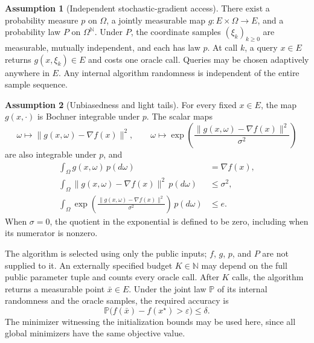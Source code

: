 \documentclass[10pt]{article}
\theoremstyle{definition}
\newtheorem{assumption}{Assumption}
\begin{document}
\begin{assumption}[Independent stochastic-gradient access]
There exist a probability measure $p$ on $\Omega$, a jointly measurable map $g:E\times\Omega\to E$, and a probability law $P$ on $\Omega^{\mathbb{N}}$. Under $P$, the coordinate samples $(\xi_k)_{k\geq0}$ are measurable, mutually independent, and each has law $p$. At call $k$, a query $x\in E$ returns $g(x,\xi_k)\in E$ and costs one oracle call. Queries may be chosen adaptively anywhere in $E$. Any internal algorithm randomness is independent of the entire sample sequence.
\end{assumption}

\begin{assumption}[Unbiasedness and light tails]
For every fixed $x\in E$, the map $g(x,\cdot)$ is Bochner integrable under $p$. The scalar maps
\[
\omega\longmapsto\|g(x,\omega)-\nabla f(x)\|^2,
\qquad
\omega\longmapsto\exp\!\left(
\frac{\|g(x,\omega)-\nabla f(x)\|^2}{\sigma^2}
\right)
\]
are also integrable under $p$, and
\begin{align*}
\int_\Omega g(x,\omega)\,p(d\omega)
&=\nabla f(x),\\
\int_\Omega\|g(x,\omega)-\nabla f(x)\|^2\,p(d\omega)
&\leq\sigma^2,\\
\int_\Omega\exp\!\left(
\frac{\|g(x,\omega)-\nabla f(x)\|^2}{\sigma^2}
\right)\,p(d\omega)
&\leq e.
\end{align*}
When $\sigma=0$, the quotient in the exponential is defined to be zero, including when its numerator is nonzero.
\end{assumption}

The algorithm is selected using only the public inputs; $f$, $g$, $p$, and $P$ are not supplied to it. An externally specified budget $K\in\mathbb{N}$ may depend on the full public parameter tuple and counts every oracle call. After $K$ calls, the algorithm returns a measurable point $\bar{x}\in E$. Under the joint law $\mathbb{P}$ of its internal randomness and the oracle samples, the required accuracy is
\[
\mathbb{P}\bigl(f(\bar{x})-f(x^\star)>\varepsilon\bigr)
\leq\delta.
\]
The minimizer witnessing the initialization bounds may be used here, since all global minimizers have the same objective value.
\end{document}

